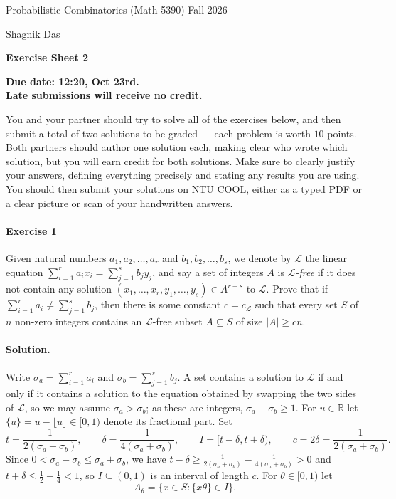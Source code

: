 \documentclass[a4paper,12pt]{article}
\newcommand{\courseTitle}{Probabilistic Combinatorics (Math 5390)}
\newcommand{\semester}{Fall 2026}
\newcommand{\instructorA}{Shagnik Das}
\newcommand{\instructorB}{}
\newcommand{\sheetNumber}{2}
\newcommand{\dueDate}{12:20, Oct 23rd.}
\newcommand{\lateWarning}{Late submissions will receive no credit.}
\newcommand{\buildtitle}[4]{
\begin{flushleft}
{\large
#1
\hfill{}
#2
\par
#3
}
\end{flushleft}
\vskip 4pt
\begin{center}
{\large\bfseries#4\par}
\end{center}
\bigskip
}
\newcommand{\card}[1]{\left| #1 \right|}
\newcommand{\mb}[1]{\mathbb{#1}}
\newcommand{\mc}[1]{\mathcal{#1}}
\begin{document}
\buildtitle{\courseTitle{}}{\semester}{\instructorA{} \hfill \instructorB{}}{Exercise Sheet \sheetNumber{}}

\vspace{-0.2in}

\begin{center}

{\bf Due date: \dueDate \\ \lateWarning}

\end{center}

\noindent You and your partner should try to solve all of the exercises below, and then submit a total of two solutions to be graded --- each problem is worth $10$ points. Both partners should author one solution each, making clear who wrote which solution, but you will earn credit for both solutions. Make sure to clearly justify your answers, defining everything precisely and stating any results you are using. You should then submit your solutions on NTU COOL, either as a typed PDF or a clear picture or scan of your handwritten answers.

\paragraph{Exercise 1}  Given natural numbers $a_1, a_2, \hdots, a_r$ and $b_1, b_2, \hdots, b_s$, we denote by $\mc L$ the linear equation $\sum_{i=1}^r a_i x_i = \sum_{j=1}^s b_j y_j$, and say a set of integers $A$ is \emph{${\mc L}$-free} if it does not contain any solution $(x_1, \hdots, x_r, y_1, \hdots, y_s) \in A^{r+s}$ to $\mc L$. Prove that if $\sum_{i=1}^r a_i \neq \sum_{j=1}^s b_j$, then there is some constant $c = c_{\mc L}$ such that every set $S$ of $n$ non-zero integers contains an $\mc L$-free subset $A \subseteq S$ of size $\card{A} \ge cn$.

\paragraph{Solution.} Write $\sigma_a = \sum_{i=1}^r a_i$ and $\sigma_b = \sum_{j=1}^s b_j$. A set contains a solution to $\mc L$ if and only if it contains a solution to the equation obtained by swapping the two sides of $\mc L$, so we may assume $\sigma_a > \sigma_b$; as these are integers, $\sigma_a - \sigma_b \ge 1$. For $u \in \mb R$ let $\{u\} = u - \lfloor u \rfloor \in [0,1)$ denote its fractional part. Set
\[
	t = \frac{1}{2(\sigma_a - \sigma_b)}, \qquad \delta = \frac{1}{4(\sigma_a + \sigma_b)}, \qquad I = [t - \delta, t + \delta), \qquad c = 2\delta = \frac{1}{2(\sigma_a + \sigma_b)}.
\]
Since $0 < \sigma_a - \sigma_b \le \sigma_a + \sigma_b$, we have $t - \delta \ge \frac{1}{2(\sigma_a+\sigma_b)} - \frac{1}{4(\sigma_a+\sigma_b)} > 0$ and $t + \delta \le \frac12 + \frac14 < 1$, so $I \subseteq (0,1)$ is an interval of length $c$. For $\theta \in [0,1)$ let
\[
	A_\theta = \{ x \in S : \{ x \theta \} \in I \}.
\]
\end{document}
